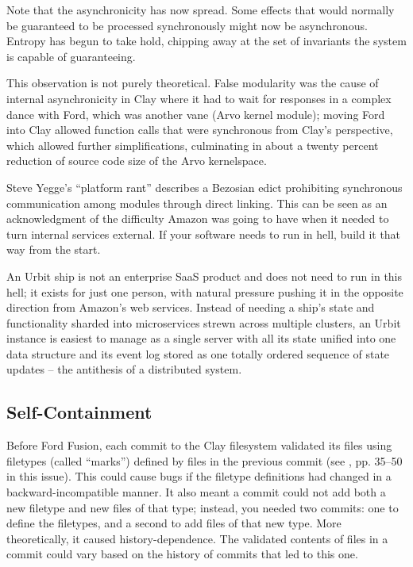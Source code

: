 \documentclass[twoside]{article}
\begin{document}
Note that the asynchronicity has now spread. Some effects that would normally be guaranteed to be processed synchronously might now be asynchronous. Entropy has begun to take hold, chipping away at the set of invariants the system is capable of guaranteeing.

This observation is not purely theoretical. False modularity was the cause of internal asynchronicity in Clay where it had to wait for responses in a complex dance with Ford, which was another vane (Arvo kernel module); moving Ford into Clay allowed function calls that were synchronous from Clay’s perspective, which allowed further simplifications, culminating in about a twenty percent reduction of source code size of the Arvo kernelspace.

Steve Yegge's ``platform rant'' \citep{Yegge2011} describes a Bezosian
edict prohibiting synchronous communication among modules through direct
linking. This can be seen as an acknowledgment of the difficulty Amazon
was going to have when it needed to turn internal services external. If
your software needs to run in hell, build it that way from the start.

An Urbit ship is not an enterprise SaaS product and does not need to run in this hell; it exists for just one person, with natural pressure pushing it in the opposite direction from Amazon’s web services. Instead of needing a ship’s state and functionality sharded into microservices strewn across multiple clusters, an Urbit instance is easiest to manage as a single server with all its state unified into one data structure and its event log stored as one totally ordered sequence of state updates – the antithesis of a distributed system.

\subsection{Self-Containment}

Before Ford Fusion, each commit to the Clay filesystem validated its files using filetypes (called ``marks'') defined by files in the previous commit (see \citet{Davis2024}, pp. 35–50 in this issue). This could cause bugs if the filetype definitions had changed in a backward-incompatible manner. It also meant a commit could not add both a new filetype and new files of that type; instead, you needed two commits: one to define the filetypes, and a second to add files of that new type. More theoretically, it caused history-dependence. The validated contents of files in a commit could vary based on the history of commits that led to this one.
\end{document}
